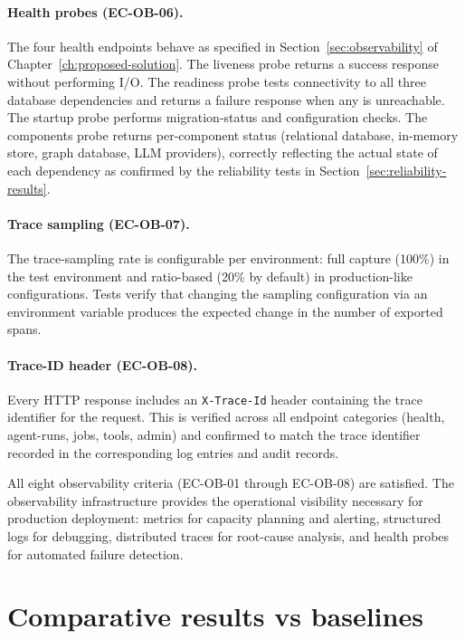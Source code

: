 \documentclass[a4paper,noexaminfo]{sapthesis}
\begin{document}
\paragraph{Health probes (EC-OB-06).}
The four health endpoints behave as specified in
Section~\ref{sec:observability} of Chapter~\ref{ch:proposed-solution}.
The liveness probe returns a success response without performing I/O.
The readiness probe tests connectivity to all three database dependencies
and returns a failure response when any is unreachable.  The startup
probe performs migration-status and configuration checks.  The components
probe returns per-component status (relational database, in-memory store,
graph database, LLM providers), correctly reflecting the actual state of
each dependency as confirmed by the reliability tests in
Section~\ref{sec:reliability-results}.

\paragraph{Trace sampling (EC-OB-07).}
The trace-sampling rate is configurable per environment: full capture
(100\%) in the test environment and ratio-based (20\% by default) in
production-like configurations.  Tests verify that changing the sampling
configuration via an environment variable produces the expected change
in the number of exported spans.

\paragraph{Trace-ID header (EC-OB-08).}
Every HTTP response includes an \texttt{X-Trace-Id} header containing
the trace identifier for the request.  This is verified across all
endpoint categories (health, agent-runs, jobs, tools, admin) and
confirmed to match the trace identifier recorded in the corresponding
log entries and audit records.

\medskip
\noindent
All eight observability criteria (EC-OB-01 through EC-OB-08) are
satisfied.  The observability infrastructure provides the operational
visibility necessary for production deployment: metrics for capacity
planning and alerting, structured logs for debugging, distributed
traces for root-cause analysis, and health probes for automated
failure detection.


\section{Comparative results vs baselines}
\label{sec:comparative-results}
\end{document}
